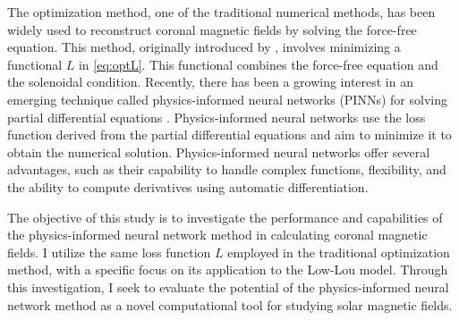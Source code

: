 The optimization method, one of the traditional numerical methods, has been widely used to reconstruct coronal magnetic fields by solving the force-free equation. This method, originally introduced by \parencite{wheatland2000optimization}, involves minimizing a functional $L$ in \cref{eq:optL}. This functional combines the force-free equation and the solenoidal condition. Recently, there has been a growing interest in an emerging technique called physics-informed neural networks (PINNs) for solving partial differential equations \parencite{karniadakis2021physics}. Physics-informed neural networks use the loss function derived from the partial differential equations and aim to minimize it to obtain the numerical solution. Physics-informed neural networks offer several advantages, such as their capability to handle complex functions, flexibility, and the ability to compute derivatives using automatic differentiation.

The objective of this study is to investigate the performance and capabilities of the physics-informed neural network method in calculating coronal magnetic fields. I utilize the same loss function $L$ employed in the traditional optimization method, with a specific focus on its application to the Low-Lou model. Through this investigation, I seek to evaluate the potential of the physics-informed neural network method as a novel computational tool for studying solar magnetic fields.